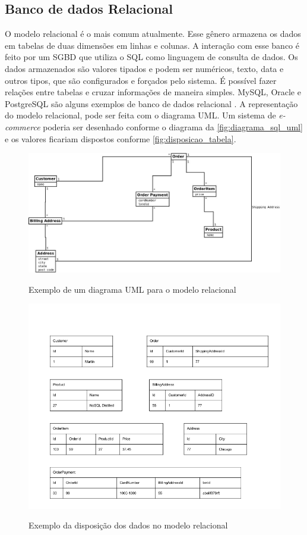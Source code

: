 \subsection{Banco de dados Relacional}
\label{subsec:relationaldatabasetype}
O modelo relacional é o mais comum atualmente. Esse gênero armazena os dados em tabelas de duas dimensões em linhas e colunas. A interação com esse banco é feito por um \ac{SGBD} que utiliza o \ac{SQL} como linguagem de consulta de dados. Os dados armazenados são valores tipados e podem ser numéricos, texto, data e outros tipos, que são configurados e forçados pelo sistema. É possível fazer relações entre tabelas e cruzar informações de maneira simples. MySQL, Oracle e PostgreSQL são alguns exemplos de banco de dados relacional \cite{SDSW}.
A representação do modelo relacional, pode ser feita com o diagrama \ac{UML}. Um sistema de \textit{e-commerce} poderia ser desenhado conforme o diagrama da \autoref{fig:diagrama_sql_uml} e os valores ficariam dispostos conforme \autoref{fig:disposicao_tabela}.
\begin{figure}[!htb]
    \centering
    \caption{Exemplo de um diagrama \ac{UML} para o modelo relacional}
    \includegraphics[width=\textwidth]{./04-figuras/diagrama_sql_uml.jpg}
    \label{fig:diagrama_sql_uml}
\end{figure}
\begin{figure}[!htb]
    \centering
    \caption{Exemplo da disposição dos dados no modelo relacional}
    \includegraphics[width=\textwidth]{./04-figuras/disposicao_dados_tabela.png}
    \label{fig:disposicao_tabela}
\end{figure}


